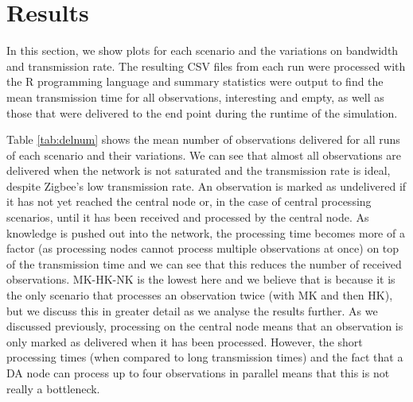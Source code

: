 \section{Results}\label{sim:res}
In this section, we show plots for each scenario and the variations on bandwidth and transmission rate. The resulting CSV files from each run were processed with the R programming language \cite{rlang} and summary statistics were output to find the mean transmission time for all observations, interesting and empty, as well as those that were delivered to the end point during the runtime of the simulation.

 Table \ref{tab:delnum} shows the mean number of observations delivered for all runs of each scenario and their variations. We can see that almost all observations are delivered when the network is not saturated and the transmission rate is ideal, despite Zigbee's low transmission rate. An observation is marked as undelivered if it has not yet reached the central node or, in the case of central processing scenarios, until it has been received and processed by the central node. As knowledge is pushed out into the network, the processing time becomes more of a factor (as processing nodes cannot process multiple observations at once) on top of the transmission time and we can see that this reduces the number of received observations. MK-HK-NK is the lowest here and we believe that is because it is the only scenario that processes an observation twice (with MK and then HK), but we discuss this in greater detail as we analyse the results further. As we discussed previously, processing on the central node means that an observation is only marked as delivered when it has been processed. However, the short processing times (when compared to long transmission times) and the fact that a DA node can process up to four observations in parallel means that this is not really a bottleneck.
 
